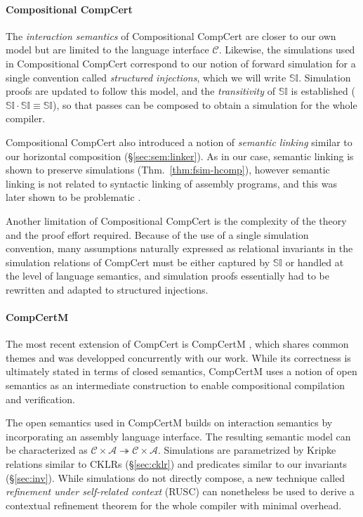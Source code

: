 \documentclass[draft,11pt]{report}
\begin{document}

\paragraph{Compositional CompCert} %

The \emph{interaction semantics} of
Compositional CompCert \cite{compcompcert}
are closer to our own model
but are limited to the language interface $\mathcal{C}$.
Likewise, the simulations used in Compositional CompCert
correspond to our notion of forward simulation
for a single convention called \emph{structured injections},
which we will write $\mathbb{SI}$.
Simulation proofs are updated to follow this model,
and the \emph{transitivity} of $\mathbb{SI}$ is established
($\mathbb{SI} \cdot \mathbb{SI} \equiv \mathbb{SI}$),
so that passes can be composed
to obtain a simulation for the whole compiler.

Compositional CompCert also introduced a notion of \emph{semantic linking}
similar to our horizontal composition
(\S\ref{sec:sem:linker}).
As in our case,
semantic linking is shown to preserve simulations
(Thm.~\ref{thm:fsim-hcomp}),
however semantic linking is not related to
syntactic linking of assembly programs,
and this was later shown to be problematic \cite{compcertm}.

Another limitation of Compositional CompCert
is the complexity of the theory
and the proof effort required.
Because of the use of a single simulation convention,
many assumptions naturally expressed as
relational invariants in the simulation relations of CompCert
must be either captured by $\mathbb{SI}$
or handled at the level of language semantics,
and simulation proofs
essentially had to be rewritten and adapted to
structured injections.


\paragraph{CompCertM} %

The most recent extension of CompCert is CompCertM \cite{compcertm},
which shares common themes and was developped concurrently
with our work.
While its correctness
is ultimately stated in terms of closed semantics,
CompCertM uses a notion of open semantics
as an intermediate construction
to enable compositional compilation and verification.

The open semantics used in CompCertM
builds on interaction semantics
by incorporating an assembly language interface.
The resulting semantic model can be characterized as
$\mathcal{C} \times \mathcal{A} \twoheadrightarrow
 \mathcal{C} \times \mathcal{A}$.
Simulations
are parametrized by Kripke relations similar to CKLRs (\S\ref{sec:cklr})
and predicates similar to our invariants (\S\ref{sec:inv}).
While simulations do not directly compose,
a new technique called \emph{refinement under self-related context}
(RUSC)
can nonetheless be used to derive a contextual refinement theorem
for the whole compiler with minimal overhead.
\end{document}

